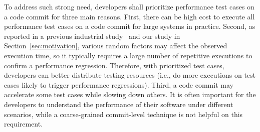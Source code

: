 %
%

To address such strong need, developers shall prioritize performance test cases on a code commit for three main reasons. First, there can be high cost to execute all performance test cases on a code commit for large systems in practice. Second, as reported in a previous industrial study~\cite{TSEPerform} and our study in Section~\ref{sec:motivation}, various random factors may affect the observed execution time, so it typically requires a large number of repetitive executions to confirm a performance regression. Therefore, with prioritized test cases, developers can better distribute testing resources  (i.e., do more executions on test cases likely to trigger performance regressions). 
Third, a code commit may accelerate some test cases while slowing down others. It is often important for the developers to understand the performance of their software under different scenarios, while a coarse-grained commit-level technique is not helpful on this requirement. \\








 



